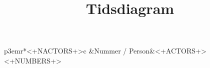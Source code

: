 \documentclass{ucph-revy}
\title{Tidsdiagram}
\begin{document}
\maketitle

\begin{longtable}{p{3em}r*{<+NACTORS+>}{c}}
  \hline
  &Nummer / Person&<+ACTORS+>\\
  \hline
  \endhead
  \hline
  \endfoot
  <+NUMBERS+>
\end{longtable}
\end{document}
